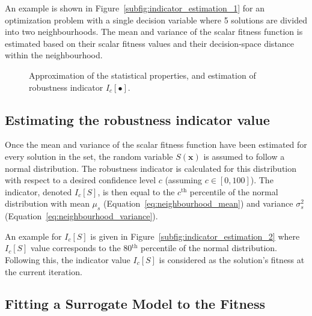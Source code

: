 \documentclass{llncs}
\newcommand{\brr}[1]{{\left({#1}\right)}} %
\newcommand{\Ic}[1]{I_c\!\left[{#1}\right]} %
\newcommand{\vx}{\mathbf{x}} %
\begin{document}
An example is shown in Figure~\ref{subfig:indicator_estimation_1} for an optimization problem with a single decision variable where 5 solutions are divided into two neighbourhoods. The mean and variance of the scalar fitness function is estimated based on their scalar fitness values and their decision-space distance within the neighbourhood.

\begin{figure}
\centering
{}
\hspace{1mm}
\caption{Approximation of the statistical properties, and estimation of robustness indicator $\Ic{\bullet}$.}
\label{fig:indicator_estimation}
\end{figure}

\subsection{Estimating the robustness indicator value}\label{subsec:robustness_indicators}

Once the mean and variance of the scalar fitness function have been estimated for every solution in the set, the random variable $S\brr{\vx}$ is assumed to follow a normal distribution. The robustness indicator is calculated for this distribution with respect to a desired confidence level $c$ (assuming $c\in[0,100]$). The indicator, denoted $\Ic{S}$, is then equal to the $c^\textrm{th}$ percentile of the normal distribution with mean $\mu_s$ (Equation~\ref{eq:neighbourhood_mean}) and variance $\sigma_s^2$ (Equation~\ref{eq:neighbourhood_variance}).

An example for $\Ic{S}$ is given in Figure~\ref{subfig:indicator_estimation_2} where $\Ic{S}$ value corresponds to the 80$^\textrm{th}$ percentile of the normal distribution. Following this, the indicator value $\Ic{S}$ is considered as the solution's fitness at the current iteration.


\subsection{Fitting a Surrogate Model to the Fitness}\label{subsec:Kriging}
\end{document}
